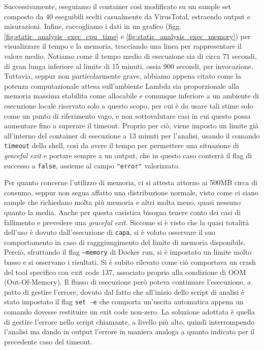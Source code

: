 Successivamente, eseguiamo il container così modificato su un sample set composto da 40 eseguibili scelti casualmente da VirusTotal, estraendo output e misurazioni. Infine, raccogliamo i dati in un grafico (figg. \ref{fig:static_analysis_exec_cpu_time} e \ref{fig:static_analysis_exec_memory}) per visualizzare il tempo e la memoria, tracciando una linea per rappresentare il valore medio. Notiamo come il tempo medio di esecuzione sia di circa 71 secondi, di gran lunga inferiore al limite di 15 minuti, ossia 900 secondi, per invocazione. Tuttavia, seppur non particolarmente grave, abbiamo appena citato come la potenza computazionale attesa sull'ambiente Lambda sia proporzionale alla memoria massima stabilita come allocabile e comunque inferiore a un ambiente di esecuzione locale riservato solo a questo scopo, per cui è da usare tali stime solo come un punto di riferimento vago, e non sottovalutare casi in cui questo possa aumentare fino a superare il timeout.
Proprio per ciò, viene imposto un limite già all'interno del container di esecuzione a 13 minuti per l'analisi, usando il comando \texttt{timeout} della shell, così da avere il tempo per permettere una situazione di \emph{graceful exit} e portare sempre a un output, che in questo caso conterrà il flag di successo a \texttt{false}, assieme al campo \texttt{"error"} valorizzato.

Per quanto concerne l'utilizzo di memoria, ci si attesta attorno ai 500MB circa di consumo, seppur non segua affatto una distribuzione normale, visto come ci siano sample che richiedano molta più memoria e altri molta meno, quasi nessuno quanto la media. Anche per questa casistica bisogna tenere conto dei casi di fallimento e prevedere una \emph{graceful exit}. Siccome si è visto che la quasi totalità dell'uso è dovuto dall'esecuzione di \texttt{capa}, si è voluto osservare il suo comportamento in caso di ragggiungimento del limite di memoria disponibile. Perciò, sfruttando il flag \texttt{--memory} di Docker run, si è impostato un limite molto basso e si osservano i risultati. Si è subito rilevato come ciò comportava un crash del tool specifico con exit code 137, associato proprio alla condizione di OOM (Out-Of-Memory). Il flusso di esecuzione però poteva continuare l'esecuzione, a patto di gestire l'errore, dovuto dal fatto che all'inizio dello script di analisi è stato impostato il flag \texttt{set -e} che comporta un'uscita automatica appena un comando dovesse restituire un exit code non-zero. La soluzione adottata è quella di gestire l'errore nello script chiamante, a livello più alto, quindi interrompendo l'analisi ma dando in output l'errore in maniera analoga a quanto indicato per il precedente caso del timeout.

